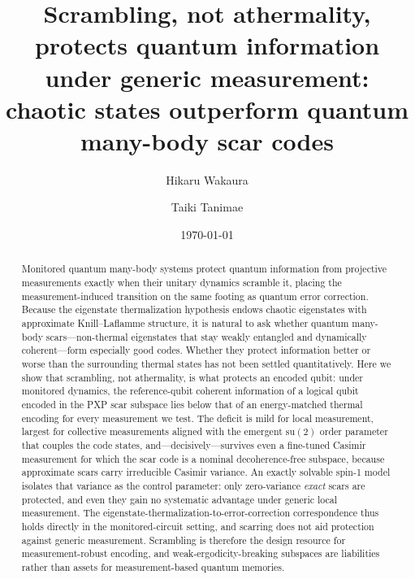 \documentclass[aps,prxquantum,twocolumn,superscriptaddress,floatfix,longbibliography]{revtex4-2}
\begin{document}
\title{Scrambling, not athermality, protects quantum information under generic
measurement: chaotic states outperform quantum many-body scar codes}

\author{Hikaru Wakaura}
\author{Taiki Tanimae}

\date{\today}   

\begin{abstract}
Monitored quantum many-body systems protect quantum information from projective
measurements exactly when their unitary dynamics scramble it, placing the
measurement-induced transition on the same footing as quantum error correction.
Because the eigenstate thermalization hypothesis endows chaotic eigenstates with
approximate Knill--Laflamme structure, it is natural to ask whether quantum
many-body scars---non-thermal eigenstates that stay weakly entangled and
dynamically coherent---form especially good codes.
Whether they protect information better or worse than the surrounding thermal
states has not been settled quantitatively.
Here we show that scrambling, not athermality, is what protects an encoded
qubit: under monitored dynamics, the reference-qubit coherent information of a
logical qubit encoded in the PXP scar subspace lies below that of an
energy-matched thermal encoding for every measurement we test.
The deficit is mild for local measurement, largest for collective measurements
aligned with the emergent $\mathrm{su}(2)$ order parameter that couples the code
states, and---decisively---survives even a fine-tuned Casimir measurement for
which the scar code is a nominal decoherence-free subspace, because approximate
scars carry irreducible Casimir variance.
An exactly solvable spin-1 model isolates that variance as the control
parameter: only zero-variance \emph{exact} scars are protected, and even they
gain no systematic advantage under generic local measurement. The
eigenstate-thermalization-to-error-correction correspondence thus holds directly
in the monitored-circuit setting, and scarring does not aid protection against
generic measurement.
Scrambling is therefore the design resource for measurement-robust encoding, and
weak-ergodicity-breaking subspaces are liabilities rather than assets for
measurement-based quantum memories.
\end{abstract}
\end{document}
